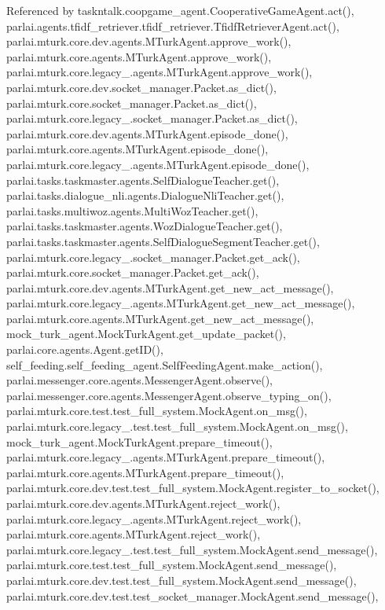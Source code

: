 Referenced by taskntalk.\+coopgame\+\_\+agent.\+Cooperative\+Game\+Agent.\+act(), parlai.\+agents.\+tfidf\+\_\+retriever.\+tfidf\+\_\+retriever.\+Tfidf\+Retriever\+Agent.\+act(), parlai.\+mturk.\+core.\+dev.\+agents.\+M\+Turk\+Agent.\+approve\+\_\+work(), parlai.\+mturk.\+core.\+agents.\+M\+Turk\+Agent.\+approve\+\_\+work(), parlai.\+mturk.\+core.\+legacy\+\_.\+agents.\+M\+Turk\+Agent.\+approve\+\_\+work(), parlai.\+mturk.\+core.\+dev.\+socket\+\_\+manager.\+Packet.\+as\+\_\+dict(), parlai.\+mturk.\+core.\+socket\+\_\+manager.\+Packet.\+as\+\_\+dict(), parlai.\+mturk.\+core.\+legacy\+\_.\+socket\+\_\+manager.\+Packet.\+as\+\_\+dict(), parlai.\+mturk.\+core.\+dev.\+agents.\+M\+Turk\+Agent.\+episode\+\_\+done(), parlai.\+mturk.\+core.\+agents.\+M\+Turk\+Agent.\+episode\+\_\+done(), parlai.\+mturk.\+core.\+legacy\+\_.\+agents.\+M\+Turk\+Agent.\+episode\+\_\+done(), parlai.\+tasks.\+taskmaster.\+agents.\+Self\+Dialogue\+Teacher.\+get(), parlai.\+tasks.\+dialogue\+\_\+nli.\+agents.\+Dialogue\+Nli\+Teacher.\+get(), parlai.\+tasks.\+multiwoz.\+agents.\+Multi\+Woz\+Teacher.\+get(), parlai.\+tasks.\+taskmaster.\+agents.\+Woz\+Dialogue\+Teacher.\+get(), parlai.\+tasks.\+taskmaster.\+agents.\+Self\+Dialogue\+Segment\+Teacher.\+get(), parlai.\+mturk.\+core.\+legacy\+\_.\+socket\+\_\+manager.\+Packet.\+get\+\_\+ack(), parlai.\+mturk.\+core.\+socket\+\_\+manager.\+Packet.\+get\+\_\+ack(), parlai.\+mturk.\+core.\+dev.\+agents.\+M\+Turk\+Agent.\+get\+\_\+new\+\_\+act\+\_\+message(), parlai.\+mturk.\+core.\+legacy\+\_.\+agents.\+M\+Turk\+Agent.\+get\+\_\+new\+\_\+act\+\_\+message(), parlai.\+mturk.\+core.\+agents.\+M\+Turk\+Agent.\+get\+\_\+new\+\_\+act\+\_\+message(), mock\+\_\+turk\+\_\+agent.\+Mock\+Turk\+Agent.\+get\+\_\+update\+\_\+packet(), parlai.\+core.\+agents.\+Agent.\+get\+I\+D(), self\+\_\+feeding.\+self\+\_\+feeding\+\_\+agent.\+Self\+Feeding\+Agent.\+make\+\_\+action(), parlai.\+messenger.\+core.\+agents.\+Messenger\+Agent.\+observe(), parlai.\+messenger.\+core.\+agents.\+Messenger\+Agent.\+observe\+\_\+typing\+\_\+on(), parlai.\+mturk.\+core.\+test.\+test\+\_\+full\+\_\+system.\+Mock\+Agent.\+on\+\_\+msg(), parlai.\+mturk.\+core.\+legacy\+\_.\+test.\+test\+\_\+full\+\_\+system.\+Mock\+Agent.\+on\+\_\+msg(), mock\+\_\+turk\+\_\+agent.\+Mock\+Turk\+Agent.\+prepare\+\_\+timeout(), parlai.\+mturk.\+core.\+legacy\+\_.\+agents.\+M\+Turk\+Agent.\+prepare\+\_\+timeout(), parlai.\+mturk.\+core.\+agents.\+M\+Turk\+Agent.\+prepare\+\_\+timeout(), parlai.\+mturk.\+core.\+dev.\+test.\+test\+\_\+full\+\_\+system.\+Mock\+Agent.\+register\+\_\+to\+\_\+socket(), parlai.\+mturk.\+core.\+dev.\+agents.\+M\+Turk\+Agent.\+reject\+\_\+work(), parlai.\+mturk.\+core.\+legacy\+\_.\+agents.\+M\+Turk\+Agent.\+reject\+\_\+work(), parlai.\+mturk.\+core.\+agents.\+M\+Turk\+Agent.\+reject\+\_\+work(), parlai.\+mturk.\+core.\+legacy\+\_.\+test.\+test\+\_\+full\+\_\+system.\+Mock\+Agent.\+send\+\_\+message(), parlai.\+mturk.\+core.\+test.\+test\+\_\+full\+\_\+system.\+Mock\+Agent.\+send\+\_\+message(), parlai.\+mturk.\+core.\+dev.\+test.\+test\+\_\+full\+\_\+system.\+Mock\+Agent.\+send\+\_\+message(), parlai.\+mturk.\+core.\+dev.\+test.\+test\+\_\+socket\+\_\+manager.\+Mock\+Agent.\+send\+\_\+message(), 